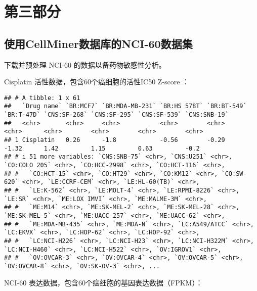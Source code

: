 \documentclass[
]{article}
\begin{document}
\hypertarget{ux7b2cux4e09ux90e8ux5206}{%
\section{第三部分}\label{ux7b2cux4e09ux90e8ux5206}}

\hypertarget{ux4f7fux7528cellminerux6570ux636eux5e93ux7684nci-60ux6570ux636eux96c6}{%
\subsection{使用CellMiner数据库的NCI-60数据集}\label{ux4f7fux7528cellminerux6570ux636eux5e93ux7684nci-60ux6570ux636eux96c6}}

下载并预处理 NCI-60 的数据以备药物敏感性分析。

Cisplatin 活性数据，包含60个癌细胞的活性IC50 Z-score ：

\begin{verbatim}
## # A tibble: 1 x 61
##   `Drug name` `BR:MCF7` `BR:MDA-MB-231` `BR:HS 578T` `BR:BT-549` `BR:T-47D` `CNS:SF-268` `CNS:SF-295` `CNS:SF-539` `CNS:SNB-19`
##   <chr>       <chr>     <chr>           <chr>        <chr>       <chr>      <chr>        <chr>        <chr>        <chr>       
## 1 Cisplatin   0.26      -1.8            -0.56        -0.29       -1.32      1.42         1.15         0.63         -0.2        
## # i 51 more variables: `CNS:SNB-75` <chr>, `CNS:U251` <chr>, `CO:COLO 205` <chr>, `CO:HCC-2998` <chr>, `CO:HCT-116` <chr>,
## #   `CO:HCT-15` <chr>, `CO:HT29` <chr>, `CO:KM12` <chr>, `CO:SW-620` <chr>, `LE:CCRF-CEM` <chr>, `LE:HL-60(TB)` <chr>,
## #   `LE:K-562` <chr>, `LE:MOLT-4` <chr>, `LE:RPMI-8226` <chr>, `LE:SR` <chr>, `ME:LOX IMVI` <chr>, `ME:MALME-3M` <chr>,
## #   `ME:M14` <chr>, `ME:SK-MEL-2` <chr>, `ME:SK-MEL-28` <chr>, `ME:SK-MEL-5` <chr>, `ME:UACC-257` <chr>, `ME:UACC-62` <chr>,
## #   `ME:MDA-MB-435` <chr>, `ME:MDA-N` <chr>, `LC:A549/ATCC` <chr>, `LC:EKVX` <chr>, `LC:HOP-62` <chr>, `LC:HOP-92` <chr>,
## #   `LC:NCI-H226` <chr>, `LC:NCI-H23` <chr>, `LC:NCI-H322M` <chr>, `LC:NCI-H460` <chr>, `LC:NCI-H522` <chr>, `OV:IGROV1` <chr>,
## #   `OV:OVCAR-3` <chr>, `OV:OVCAR-4` <chr>, `OV:OVCAR-5` <chr>, `OV:OVCAR-8` <chr>, `OV:SK-OV-3` <chr>, ...
\end{verbatim}

NCI-60 表达数据，包含60个癌细胞的基因表达数据（FPKM）：
\end{document}
